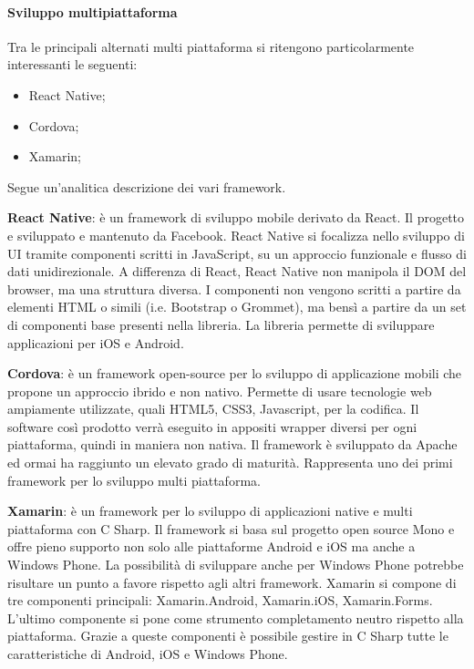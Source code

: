 \paragraph{Sviluppo multipiattaforma}
Tra le principali alternati multi piattaforma si ritengono particolarmente interessanti le seguenti:
\begin{itemize}
    \item React Native;
    \item Cordova;
    \item Xamarin;
\end{itemize}
Segue un’analitica descrizione dei vari framework.

\textbf{React Native}: è un framework di sviluppo mobile derivato da React. Il progetto e sviluppato e mantenuto da Facebook. React Native si focalizza nello sviluppo di UI tramite componenti scritti in JavaScript, su un approccio funzionale e flusso di dati unidirezionale.  A differenza di React, React Native non manipola il DOM del browser, ma una struttura diversa. I componenti non vengono scritti a partire da elementi HTML o simili (i.e. Bootstrap o Grommet), ma bensì a partire da un set di componenti base presenti nella libreria. La libreria permette di sviluppare applicazioni per iOS e Android.

\textbf{Cordova}: è un framework open-source per lo sviluppo di applicazione mobili che propone un approccio ibrido e non nativo. Permette di usare tecnologie web ampiamente utilizzate, quali HTML5, CSS3, Javascript, per la codifica. Il software così prodotto verrà eseguito in appositi wrapper diversi per ogni piattaforma, quindi in maniera non nativa. Il framework è sviluppato da Apache ed ormai ha raggiunto un elevato grado di maturità. Rappresenta uno dei primi framework per lo sviluppo multi piattaforma.

\textbf{Xamarin}: è un framework per lo sviluppo di applicazioni native e multi piattaforma con C Sharp. Il framework si basa sul progetto open source Mono e offre pieno supporto non solo alle piattaforme Android e iOS ma anche a Windows Phone. La possibilità di sviluppare anche per Windows Phone potrebbe risultare un punto a favore rispetto agli altri framework. Xamarin si compone di tre componenti principali: Xamarin.Android, Xamarin.iOS, Xamarin.Forms. L’ultimo componente si pone come strumento completamento neutro rispetto alla piattaforma. Grazie a queste componenti è possibile gestire in C Sharp tutte le caratteristiche di Android, iOS e Windows Phone.
\medskip

